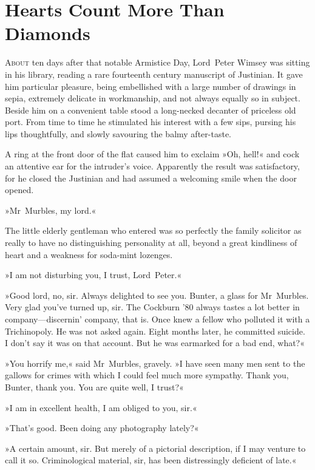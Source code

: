 \chapter{Hearts Count More Than Diamonds}
\lettrine[lines=4]{A}{bout} ten days after that notable Armistice Day, Lord~Peter Wimsey was sitting in his library, reading a rare fourteenth century manuscript of Justinian. It gave him particular pleasure, being embellished with a large number of drawings in sepia, extremely delicate in workmanship, and not always equally so in subject. Beside him on a convenient table stood a long-necked decanter of priceless old port. From time to time he stimulated his interest with a few sips, pursing his lips thoughtfully, and slowly savouring the balmy after-taste.

A ring at the front door of the flat caused him to exclaim »Oh, hell!« and cock an attentive ear for the intruder's voice. Apparently the result was satisfactory, for he closed the Justinian and had assumed a welcoming smile when the door opened.

»Mr~Murbles, my lord.«

The little elderly gentleman who entered was so perfectly the family solicitor as really to have no distinguishing personality at all, beyond a great kindliness of heart and a weakness for soda-mint lozenges.

»I am not disturbing you, I trust, Lord~Peter.«

»Good lord, no, sir. Always delighted to see you. Bunter, a glass for Mr~Mur\-bles. Very glad you've turned up, sir. The Cockburn '80 always tastes a lot better in company—discernin' company, that is. Once knew a fellow who polluted it with a Trichinopoly. He was not asked again. Eight months later, he committed suicide. I don't say it was on that account. But he was earmarked for a bad end, what?«

»You horrify me,« said Mr~Murbles, gravely. »I have seen many men sent to the gallows for crimes with which I could feel much more sympathy. Thank you, Bunter, thank you. You are quite well, I trust?«

»I am in excellent health, I am obliged to you, sir.«

»That's good. Been doing any photography lately?«

»A certain amount, sir. But merely of a pictorial description, if I may venture to call it so. Criminological material, sir, has been distressingly deficient of late.«

